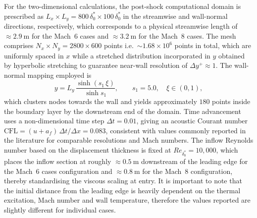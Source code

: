 For the two-dimensional calculations, the post-shock computational domain is prescribed as $L_x\times L_y=800\,\delta^{*}_{0}\times 100\,\delta^{*}_{0}$ in the streamwise and wall-normal directions, respectively, which corresponds to a physical streamwise length of $\approx 2.9~\mathrm{m}$ for the Mach~6 cases and $\approx 3.2~\mathrm{m}$ for the Mach~8 cases. The mesh comprises $N_x\times N_y=2800\times 600$ points i.e.\ $\sim 1.68\times 10^{6}$  points in total, which are uniformly spaced in $x$ while a stretched distribution incorporated in $y$ obtained by hyperbolic stretching to guarantee near-wall resolution of $\Delta y^{+}\approx 1$. The wall-normal mapping employed is
\begin{equation}
y=L_y\,\frac{\sinh\!\left(s_1\,\xi\right)}{\sinh s_1},\qquad s_1=5.0,\quad \xi\in(0,1),
\end{equation} which clusters nodes towards the wall and yields approximately $180$ points inside the boundary layer by the downstream end of the domain. Time advancement uses a non-dimensional time step \(\Delta t=0.01\), giving an acoustic Courant number $\mathrm{CFL}=(u+a_f)\,\Delta t/\Delta x=0.083$, consistent with values commonly reported in the literature for comparable resolutions and Mach numbers. The inflow Reynolds number based on the displacement thickness is fixed at $Re_{\delta^{*}_0}=10{,}000$, which places the inflow section at roughly $\approx 0.5~\mathrm{m}$ downstream of the leading edge for the Mach~6 cases configuration and $\approx 0.8~\mathrm{m}$ for the Mach~8 configuration, thereby standardising the viscous scaling at entry. It is important to note that the initial distance from the leading edge is heavily dependent on the thermal excitation, Mach number and wall temperature, therefore the values reported are slightly different for individual cases. 

